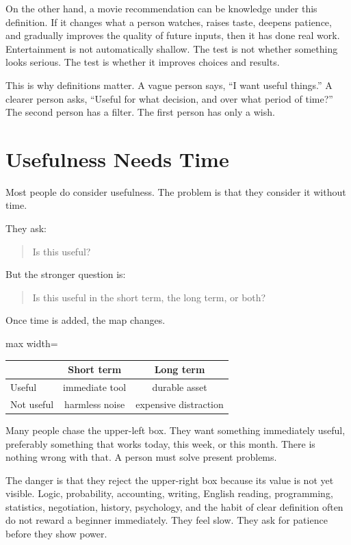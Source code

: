 On the other hand, a movie recommendation can be knowledge under this definition. If it changes what a person watches, raises taste, deepens patience, and gradually improves the quality of future inputs, then it has done real work. Entertainment is not automatically shallow. The test is not whether something looks serious. The test is whether it improves choices and results.

This is why definitions matter. A vague person says, ``I want useful things.'' A clearer person asks, ``Useful for what decision, and over what period of time?'' The second person has a filter. The first person has only a wish.

\section*{Usefulness Needs Time}

Most people do consider usefulness. The problem is that they consider it without time.

They ask:

\begin{quote}
Is this useful?
\end{quote}

But the stronger question is:

\begin{quote}
Is this useful in the short term, the long term, or both?
\end{quote}

Once time is added, the map changes.

\begin{center}
\begin{adjustbox}{max width=\linewidth}
\begin{tabular}{lcc}
\hline
 & Short term & Long term \\
\hline
Useful & immediate tool & durable asset \\
Not useful & harmless noise & expensive distraction \\
\hline
\end{tabular}
\end{adjustbox}
\end{center}

Many people chase the upper-left box. They want something immediately useful, preferably something that works today, this week, or this month. There is nothing wrong with that. A person must solve present problems.

The danger is that they reject the upper-right box because its value is not yet visible. Logic, probability, accounting, writing, English reading, programming, statistics, negotiation, history, psychology, and the habit of clear definition often do not reward a beginner immediately. They feel slow. They ask for patience before they show power.

